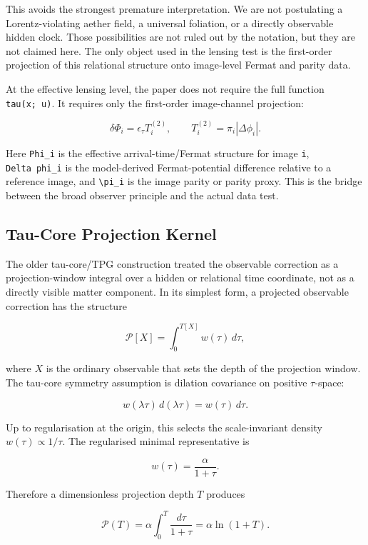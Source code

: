 \documentclass[11pt]{article}
\begin{document}
This avoids the strongest premature interpretation. We are not
postulating a Lorentz-violating aether field, a universal foliation, or
a directly observable hidden clock. Those possibilities are not ruled
out by the notation, but they are not claimed here. The only object used
in the lensing test is the first-order projection of this relational
structure onto image-level Fermat and parity data.

At the effective lensing level, the paper does not require the full
function \texttt{tau(x;\ u)}. It requires only the first-order
image-channel projection:

\[
\delta \Phi_i = \epsilon_\tau T^{(2)}_i,
\qquad
T^{(2)}_i = \pi_i |\Delta \phi_i|.
\]

Here \texttt{Phi\_i} is the effective arrival-time/Fermat structure for
image \texttt{i}, \texttt{Delta\ phi\_i} is the model-derived
Fermat-potential difference relative to a reference image, and
\texttt{\textbackslash{}pi\_i} is the image parity or parity proxy. This
is the bridge between the broad observer principle and the actual data
test.

\subsection{Tau-Core Projection
Kernel}\label{tau-core-projection-kernel}

The older tau-core/TPG construction treated the observable correction as
a projection-window integral over a hidden or relational time
coordinate, not as a directly visible matter component. In its simplest
form, a projected observable correction has the structure

\[
\mathcal{P}[X]
=
\int_0^{T[X]} w(\tau)\,d\tau,
\]

where \(X\) is the ordinary observable that sets the depth of the
projection window. The tau-core symmetry assumption is dilation
covariance on positive \(\tau\)-space:

\[
w(\lambda\tau)\,d(\lambda\tau)
=
w(\tau)\,d\tau.
\]

Up to regularisation at the origin, this selects the scale-invariant
density \(w(\tau)\propto 1/\tau\). The regularised minimal
representative is

\[
w(\tau)=\frac{\alpha}{1+\tau}.
\]

Therefore a dimensionless projection depth \(T\) produces

\[
\mathcal{P}(T)
=
\alpha\int_0^T \frac{d\tau}{1+\tau}
=
\alpha\ln(1+T).
\]
\end{document}
